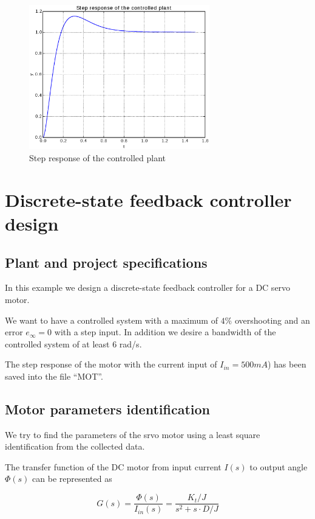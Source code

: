 \begin{figure}[htbp]	%
\centering
\includegraphics[width=0.7\textwidth]{eps/pidexastep.eps}
\caption{Step response of the controlled plant}
\label{F14}
\end{figure}

\section{Discrete-state feedback controller design}

\subsection{Plant and project specifications}

In this example we design a discrete-state feedback controller for a DC servo 
motor. 

We want to have a controlled system with a maximum of $4\%$ 
overshooting and an error $e_{\infty}=0$ with a step input. In addition we 
desire a bandwidth of the controlled system of at least $6$ rad/s.

The step response of the motor with the current input of $I_{in}=500mA$) has 
been saved into the file ``MOT''.

\subsection{Motor parameters identification}

We try to find the parameters of the srvo motor using a least square 
identification from the collected data.

The transfer function of the DC motor from input current $I(s)$ to output angle 
$\Phi(s)$ can be represented as

$$
G(s)=\frac{\Phi(s)}{I_{in}(s)}=\frac{K_t/J}{s^2 + s \cdot D/J}
$$

